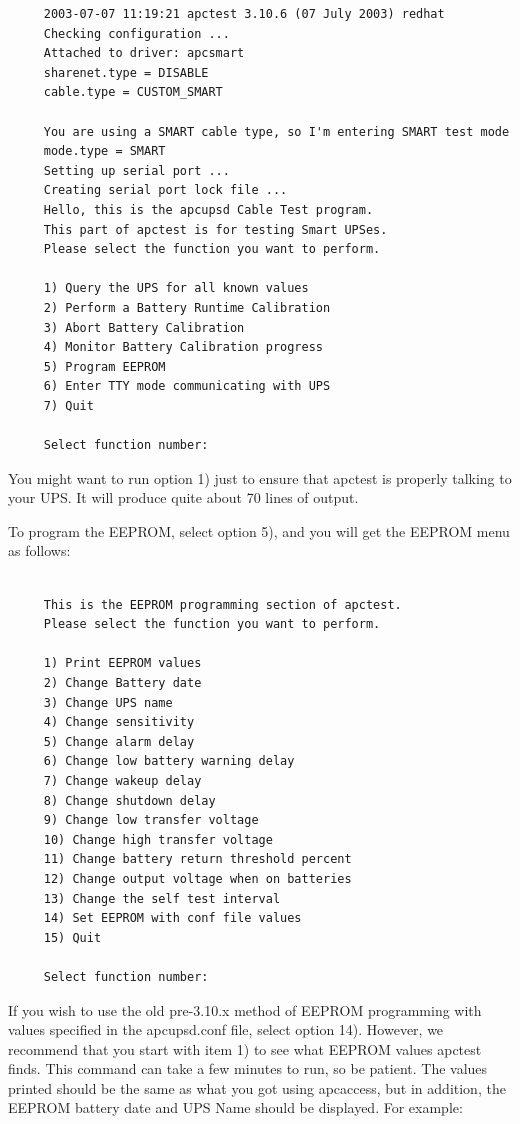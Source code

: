 {{{{{{{{{\begin{verbatim}
     2003-07-07 11:19:21 apctest 3.10.6 (07 July 2003) redhat
     Checking configuration ...
     Attached to driver: apcsmart
     sharenet.type = DISABLE
     cable.type = CUSTOM_SMART
     
     You are using a SMART cable type, so I'm entering SMART test mode
     mode.type = SMART
     Setting up serial port ...
     Creating serial port lock file ...
     Hello, this is the apcupsd Cable Test program.
     This part of apctest is for testing Smart UPSes.
     Please select the function you want to perform.
     
     1) Query the UPS for all known values
     2) Perform a Battery Runtime Calibration
     3) Abort Battery Calibration
     4) Monitor Battery Calibration progress
     5) Program EEPROM
     6) Enter TTY mode communicating with UPS
     7) Quit
     
     Select function number:
\end{verbatim}
\normalsize

You might want to run option 1) just to ensure that apctest is properly
talking to your UPS. It will produce quite about 70 lines of output.  

To program the EEPROM, select option 5), and you will get the EEPROM menu as
follows: 

\footnotesize
\begin{verbatim}
     
     This is the EEPROM programming section of apctest.
     Please select the function you want to perform.
     
     1) Print EEPROM values
     2) Change Battery date
     3) Change UPS name
     4) Change sensitivity
     5) Change alarm delay
     6) Change low battery warning delay
     7) Change wakeup delay
     8) Change shutdown delay
     9) Change low transfer voltage
     10) Change high transfer voltage
     11) Change battery return threshold percent
     12) Change output voltage when on batteries
     13) Change the self test interval
     14) Set EEPROM with conf file values
     15) Quit
     
     Select function number:
\end{verbatim}
\normalsize

If you wish to use the old pre-3.10.x method of EEPROM programming with values
specified in the apcupsd.conf file, select option 14). However, we recommend
that you start with item 1) to see what EEPROM values apctest finds. This
command can take a few minutes to run, so be patient. The values printed
should be the same as what you got using apcaccess, but in addition, the
EEPROM battery date and UPS Name should be displayed. For example: 

}}}}}}}}}
